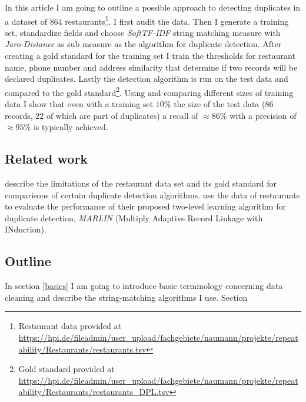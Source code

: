 \documentclass[conference]{IEEEtran}
\begin{document}
In this article I am going to outline a possible approach to detecting duplicates in a dataset of 864 
restaurants\footnote{Restaurant data provided at \url{https://hpi.de/fileadmin/user_upload/fachgebiete/naumann/projekte/repeatability/Restaurants/restaurants.tsv}}.
I first audit the data. Then  I generate a training set, standardize fields and choose \emph{SoftTF-IDF} string matching measure with \emph{Jaro-Distance} as sub measure as the algorithm for duplicate detection. After creating a gold standard for the training set I train the thresholds for restaurant name, phone number and address similarity that determine if two records will be declared duplicates. Lastly the detection algorithm is run on the test data and compared to the gold 
standard\footnote{Gold standard provided at \url{https://hpi.de/fileadmin/user_upload/fachgebiete/naumann/projekte/repeatability/Restaurants/restaurants_DPL.tsv}}.
Using and comparing different sizes of training data I show that even with a training set $10\%$  the size of the test data (86 records, 22 of which are part of duplicates) a recall of $\approx86\%$ with a precision of $\approx95\%$ is typically achieved.

\subsection{Related work}
\textcite{Vogel.2014} describe the limitations of the restaurant data set and its gold standard for comparisons of certain duplicate detection algorithms.
\textcite{Bilenko.2003b} use the data of restaurants to evaluate the performance of their proposed two-level learning algorithm for duplicate detection, \emph{MARLIN} (Multiply Adaptive Record Linkage with INduction).

\subsection{Outline}
In section \ref{basics} I am going to introduce basic terminology concerning data cleaning and describe the string-matching algorithms I use. Section 
\end{document}
